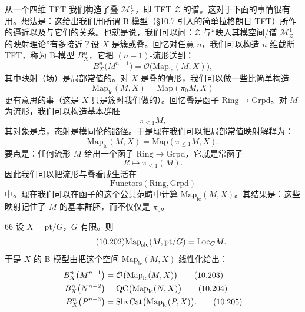 从一个四维 TFT 我们构造了叠 $\mathcal{M}_{\mathcal{Z}}^{1}$，即 TFT $\mathcal{Z}$ 的谱。这对于下面的事情很有用。想法是：这给出我们用所谓 B-模型（\S10.7 引入的简单拉格朗日 TFT）所作的逼近以及与它们的关系。也就是说，我们可以问：$\mathcal{Z}$ 与“映入其模空间/谱 $\mathcal{M}_{\mathcal{Z}}^{1}$ 的映射理论”有多接近？设 $X$ 是簇或叠。回忆对任意 $n$，我们可以构造 $n$ 维截断 TFT，称为 B-模型 $B_X^{n}$，它把 $(n-1)$-流形送到：
\begin{equation}\tag{10.196}
B_X^{n}\big(M^{n-1}\big)=\mathcal{O}\big(\mathrm{Map}_{\mathrm{lc}}(M,X)\big),
\end{equation}
其中映射（场）是局部常值的。对 $X$ 是叠的情形，我们可以做一些比简单构造
\begin{equation}\tag{10.197}
\mathrm{Map}_{\mathrm{lc}}(M,X)=\mathrm{Map}(\pi_0M,X)
\end{equation}
更有意思的事（这是 $X$ 只是簇时我们做的）。回忆叠是函子 $\mathrm{Ring}\to\mathrm{Grpd}$。对 $M$ 为流形，我们可以构造基本群胚
\begin{equation}\tag{10.198}
\pi_{\le1}M,
\end{equation}
其对象是点，态射是模同伦的路径。于是现在我们可以把局部常值映射解释为：
\begin{equation}\tag{10.199}
\mathrm{Map}_{\mathrm{lc}}(M,X)=\mathrm{Map}(\pi_{\le1}M,X).
\end{equation}
要点是：任何流形 $M$ 给出一个函子 $\mathrm{Ring}\to\mathrm{Grpd}$，它就是常函子
\begin{equation}\tag{10.200}
R\mapsto\pi_{\le1}(M).
\end{equation}
因此我们可以把流形与叠看成生活在
\begin{equation}\tag{10.201}
\mathrm{Functors}(\mathrm{Ring},\mathrm{Grpd})
\end{equation}
中。现在我们可以在函子的这个公共范畴中计算 $\mathrm{Map}_{\mathrm{lc}}(M,X)$。其结果是：这些映射记住了 $M$ 的基本群胚，而不仅仅是 $\pi_0$。

\begin{srcex}{66}
设 $X=\mathrm{pt}/G$，$G$ 有限。则
\begin{equation}\tag{10.202}
\mathrm{Map}_{\mathrm{slc}}(M,\mathrm{pt}/G)=\mathrm{Loc}_G M.
\end{equation}
于是 $X$ 的 B-模型由把这个空间 $\mathrm{Map}_{\mathrm{lc}}(M,X)$ 线性化给出：
\begin{align}
B_X^{n}\big(M^{n-1}\big)&=\mathcal{O}\big(\mathrm{Map}_{\mathrm{lc}}(M,X)\big)\tag{10.203}\\
B_X^{n}\big(N^{n-2}\big)&=\mathrm{QC}\big(\mathrm{Map}_{\mathrm{lc}}(N,X)\big)\tag{10.204}\\
B_X^{n}\big(P^{n-3}\big)&=\mathrm{ShvCat}\big(\mathrm{Map}_{\mathrm{lc}}(P,X)\big).\tag{10.205}
\end{align}
\end{srcex}

